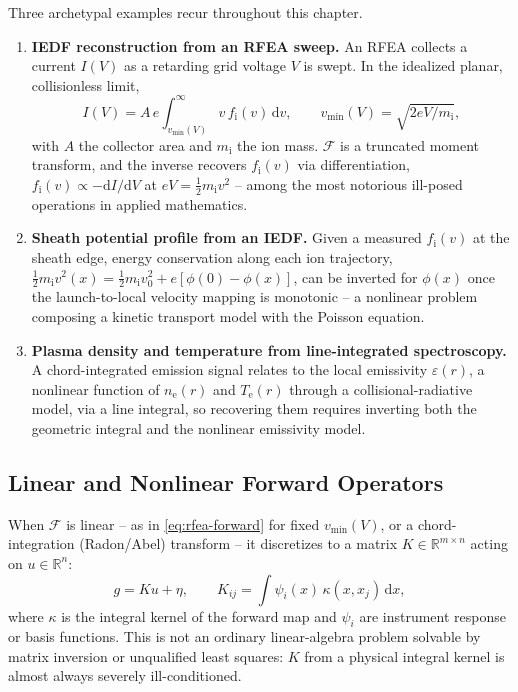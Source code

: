 Three archetypal examples recur throughout this chapter.

\begin{enumerate}
\item \textbf{IEDF reconstruction from an RFEA sweep.} An RFEA collects a current $I(V)$ as a retarding grid voltage $V$ is swept. In the idealized planar, collisionless limit,
\begin{equation}
I(V) = A\, e \int_{v_{\min}(V)}^{\infty} v\, f_{\mathrm{i}}(v)\, \mathrm{d}v, \qquad v_{\min}(V) = \sqrt{2eV/m_{\mathrm{i}}},
\label{eq:rfea-forward}
\end{equation}
with $A$ the collector area and $m_{\mathrm{i}}$ the ion mass. $\mathcal{F}$ is a truncated moment transform, and the inverse recovers $f_{\mathrm{i}}(v)$ via differentiation, $f_{\mathrm{i}}(v) \propto - \mathrm{d}I/\mathrm{d}V$ at $eV = \tfrac{1}{2}m_{\mathrm{i}}v^{2}$ -- among the most notorious ill-posed operations in applied mathematics.
\item \textbf{Sheath potential profile from an IEDF.} Given a measured $f_{\mathrm{i}}(v)$ at the sheath edge, energy conservation along each ion trajectory, $\tfrac{1}{2}m_{\mathrm{i}}v^{2}(x) = \tfrac{1}{2}m_{\mathrm{i}}v_{0}^{2} + e[\phi(0)-\phi(x)]$, can be inverted for $\phi(x)$ once the launch-to-local velocity mapping is monotonic -- a nonlinear problem composing a kinetic transport model with the Poisson equation.
\item \textbf{Plasma density and temperature from line-integrated spectroscopy.} A chord-integrated emission signal relates to the local emissivity $\varepsilon(r)$, a nonlinear function of $n_{\mathrm{e}}(r)$ and $T_{\mathrm{e}}(r)$ through a collisional-radiative model, via a line integral, so recovering them requires inverting both the geometric integral and the nonlinear emissivity model.
\end{enumerate}

\subsection{Linear and Nonlinear Forward Operators}

When $\mathcal{F}$ is linear -- as in \cref{eq:rfea-forward} for fixed $v_{\min}(V)$, or a chord-integration (Radon/Abel) transform -- it discretizes to a matrix $K \in \mathbb{R}^{m \times n}$ acting on $u \in \mathbb{R}^{n}$:
\begin{equation}
g = Ku + \eta, \qquad K_{ij} = \int \psi_{i}(x)\, \kappa(x, x_{j})\, \mathrm{d}x,
\label{eq:linear-discrete}
\end{equation}
where $\kappa$ is the integral kernel of the forward map and $\psi_i$ are instrument response or basis functions. This is not an ordinary linear-algebra problem solvable by matrix inversion or unqualified least squares: $K$ from a physical integral kernel is almost always severely ill-conditioned.

